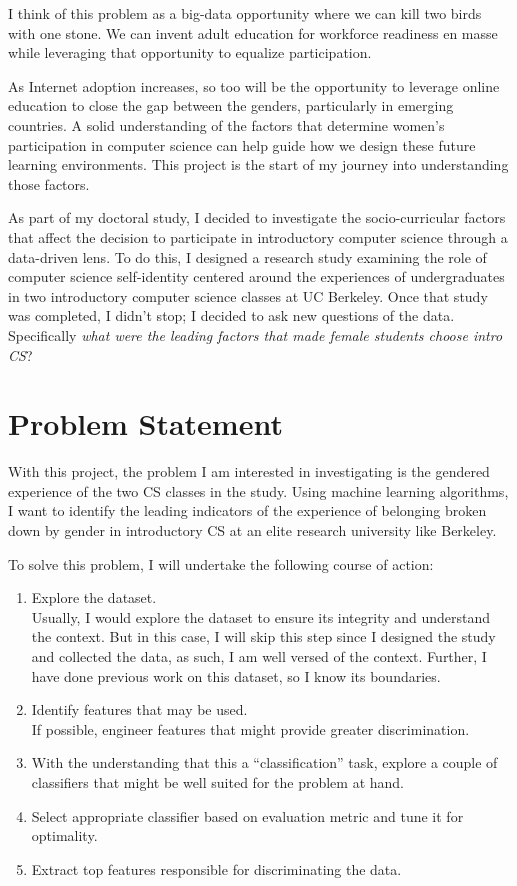 I think of this problem as a big-data opportunity where we can kill two birds with one stone. We can invent adult education for workforce readiness en masse while leveraging that opportunity to equalize participation.

As Internet adoption increases, so too will be the opportunity to leverage online education to close the gap between the genders, particularly in emerging countries. A solid understanding of the factors that determine women's participation in computer science can help guide how we design these future learning environments.  This project is the start of my journey into understanding those factors.

As part of my doctoral study, I decided to investigate the socio-curricular factors that affect the decision to participate in introductory computer science through a data-driven lens. To do this, I designed a research study examining the role of computer science self-identity centered around the experiences of undergraduates in two introductory computer science classes at UC Berkeley. Once that study was completed, I didn't stop; I decided to ask new questions of the data. Specifically \textit{what were the leading factors that made female students choose intro CS}?


\section*{Problem Statement}

With this project, the problem I am interested in investigating is the gendered experience of the two CS classes in the study. Using machine learning algorithms, I want to identify the leading indicators of the experience of belonging broken down by gender in introductory CS at an elite research university like Berkeley.

To solve this problem, I will undertake the following course of action:
\begin{enumerate}%
\item Explore the dataset.\\
Usually, I would explore the dataset to ensure its integrity and understand the context. But in this case, I will skip this step since I designed the study and collected the data, as such, I am well versed of the context. Further, I have done previous work on this dataset, so I know its boundaries.
\item Identify features that may be used.\\ 
If possible, engineer features that might provide greater discrimination.
\item With the understanding that this a ``classification'' task, explore a couple of classifiers that might be well suited for the problem at hand.
\item Select appropriate classifier based on evaluation metric and tune it for optimality.
\item Extract top features responsible for discriminating the data.
\end{enumerate}

